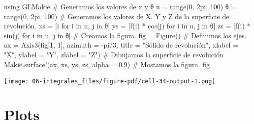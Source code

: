 \documentclass[
  a4paper,
]{scrreport}
\newenvironment{Shaded}{\begin{snugshade}}{\end{snugshade}}
\newcommand{\BuiltInTok}[1]{\textcolor[rgb]{0.00,0.23,0.31}{#1}}
\newcommand{\CommentTok}[1]{\textcolor[rgb]{0.37,0.37,0.37}{#1}}
\newcommand{\ConstantTok}[1]{\textcolor[rgb]{0.56,0.35,0.01}{#1}}
\newcommand{\FloatTok}[1]{\textcolor[rgb]{0.68,0.00,0.00}{#1}}
\newcommand{\FunctionTok}[1]{\textcolor[rgb]{0.28,0.35,0.67}{#1}}
\newcommand{\ImportTok}[1]{\textcolor[rgb]{0.00,0.46,0.62}{#1}}
\newcommand{\KeywordTok}[1]{\textcolor[rgb]{0.00,0.23,0.31}{#1}}
\newcommand{\NormalTok}[1]{\textcolor[rgb]{0.00,0.23,0.31}{#1}}
\newcommand{\OperatorTok}[1]{\textcolor[rgb]{0.37,0.37,0.37}{#1}}
\newcommand{\StringTok}[1]{\textcolor[rgb]{0.13,0.47,0.30}{#1}}
\theoremstyle{definition}
\theoremstyle{remark}
\begin{document}
\begin{tcolorbox}
\begin{Shaded}
\begin{Highlighting}[]
\ImportTok{using} \BuiltInTok{GLMakie}
\CommentTok{\# Generamos los valores de x y θ}
\NormalTok{u }\OperatorTok{=} \FunctionTok{range}\NormalTok{(}\FloatTok{0}\NormalTok{, }\FloatTok{2}\NormalTok{pi, }\FloatTok{100}\NormalTok{)}
\NormalTok{θ }\OperatorTok{=} \FunctionTok{range}\NormalTok{(}\FloatTok{0}\NormalTok{, }\FloatTok{2}\NormalTok{pi, }\FloatTok{100}\NormalTok{)}
\CommentTok{\# Generamos los valores de X, Y y Z de la superficie de revolución.}
\NormalTok{xs }\OperatorTok{=}\NormalTok{ [i for i }\KeywordTok{in}\NormalTok{ u, j }\KeywordTok{in}\NormalTok{ θ]}
\NormalTok{ys }\OperatorTok{=}\NormalTok{ [}\FunctionTok{f}\NormalTok{(i) }\OperatorTok{*} \FunctionTok{cos}\NormalTok{(j) for i }\KeywordTok{in}\NormalTok{ u, j }\KeywordTok{in}\NormalTok{ θ]}
\NormalTok{zs }\OperatorTok{=}\NormalTok{ [}\FunctionTok{f}\NormalTok{(i) }\OperatorTok{*} \FunctionTok{sin}\NormalTok{(j) for i }\KeywordTok{in}\NormalTok{ u, j }\KeywordTok{in}\NormalTok{ θ]}
\CommentTok{\# Creamos la figura.}
\NormalTok{fig }\OperatorTok{=} \FunctionTok{Figure}\NormalTok{()}
\CommentTok{\# Definimos los ejes.}
\NormalTok{ax }\OperatorTok{=} \FunctionTok{Axis3}\NormalTok{(fig[}\FloatTok{1}\NormalTok{, }\FloatTok{1}\NormalTok{], azimuth }\OperatorTok{=} \OperatorTok{{-}}\ConstantTok{pi}\OperatorTok{/}\FloatTok{3}\NormalTok{, title }\OperatorTok{=} \StringTok{"Sólido de revolución"}\NormalTok{, xlabel }\OperatorTok{=} \StringTok{"X"}\NormalTok{, ylabel }\OperatorTok{=} \StringTok{"Y"}\NormalTok{, zlabel }\OperatorTok{=} \StringTok{"Z"}\NormalTok{)}
\CommentTok{\# Dibujamos la superficie de revolución}
\NormalTok{Makie.}\FunctionTok{surface!}\NormalTok{(ax, xs, ys, zs, alpha }\OperatorTok{=} \FloatTok{0.9}\NormalTok{)}
\CommentTok{\# Mostamos la figura.}
\NormalTok{fig}
\end{Highlighting}
\end{Shaded}

\texttt{[image: 06-integrales\_files/figure-pdf/cell-34-output-1.png]}

\section{Plots}


\end{tcolorbox}
\end{document}
